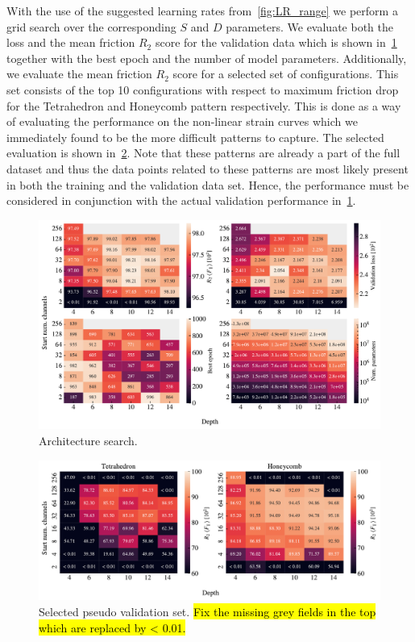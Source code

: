 With the use of the suggested learning rates from~\cref{fig:LR_range} we perform
a grid search over the corresponding $S$ and $D$ parameters. We evaluate both
the loss and the mean friction $R_2$ score for the validation data which is shown in~\cref{fig:A_search_perf} together with the best epoch and the number of model
parameters. Additionally, we evaluate the mean friction $R_2$ score for a
selected set of configurations. This set consists of the top 10 configurations
with respect to maximum friction drop for the Tetrahedron and Honeycomb pattern
respectively. This is done as a way of evaluating the performance on the
non-linear strain curves which we immediately found to be the more difficult patterns to capture. The selected evaluation is shown in~\cref{fig:A_search_compare}. Note
that these patterns are already a part of the full dataset and thus the data points
related to these patterns are most likely present in both the training and the validation data set. Hence, the performance must be considered in conjunction with the actual validation performance in~\cref{fig:A_search_perf}.

\begin{figure}[H]
  \centering
  \includegraphics[width=\linewidth]{figures/ML/A_search_perf.pdf}
  \caption{Architecture search.}
  \label{fig:A_search_perf}
\end{figure}  

\begin{figure}[H]
  \centering
  \includegraphics[width=\linewidth]{figures/ML/A_search_compare_perf}
  \caption{Selected pseudo validation set. \hl{Fix the missing grey fields in the top which are replaced by < 0.01.}}
  \label{fig:A_search_compare}
\end{figure}  

